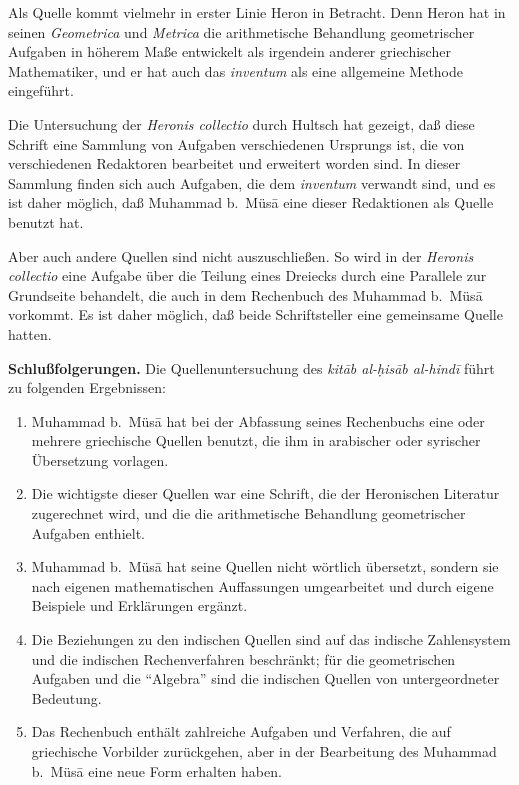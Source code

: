 \documentclass[11pt,a4paper]{article}
\newcommand{\enquote}[1]{``#1''}
\begin{document}
Als Quelle kommt vielmehr in erster Linie Heron in Betracht. Denn Heron hat in seinen \textit{Geometrica} und \textit{Metrica} die arithmetische Behandlung geometrischer Aufgaben in h\"oherem Ma\ss{}e entwickelt als irgendein anderer griechischer Mathematiker, und er hat auch das \textit{inventum} als eine allgemeine Methode eingef\"uhrt.

Die Untersuchung der \textit{Heronis collectio} durch Hultsch hat gezeigt, da\ss{} diese Schrift eine Sammlung von Aufgaben verschiedenen Ursprungs ist, die von verschiedenen Redaktoren bearbeitet und erweitert worden sind. In dieser Sammlung finden sich auch Aufgaben, die dem \textit{inventum} verwandt sind, und es ist daher m\"oglich, da\ss{} Muhammad b.\ M\"us\=a eine dieser Redaktionen als Quelle benutzt hat.

Aber auch andere Quellen sind nicht auszuschlie\ss{}en. So wird in der \textit{Heronis collectio} eine Aufgabe \"uber die Teilung eines Dreiecks durch eine Parallele zur Grundseite behandelt, die auch in dem Rechenbuch des Muhammad b.\ M\"us\=a vorkommt. Es ist daher m\"oglich, da\ss{} beide Schriftsteller eine gemeinsame Quelle hatten.

\textbf{Schlu\ss{}folgerungen.} Die Quellenuntersuchung des \textit{kit\=ab al-\d{h}is\=ab al-hind\=i} f\"uhrt zu folgenden Ergebnissen:

\begin{enumerate}
\item Muhammad b.\ M\"us\=a hat bei der Abfassung seines Rechenbuchs eine oder mehrere griechische Quellen benutzt, die ihm in arabischer oder syrischer \"Ubersetzung vorlagen.
\item Die wichtigste dieser Quellen war eine Schrift, die der Heronischen Literatur zugerechnet wird, und die die arithmetische Behandlung geometrischer Aufgaben enthielt.
\item Muhammad b.\ M\"us\=a hat seine Quellen nicht w\"ortlich \"ubersetzt, sondern sie nach eigenen mathematischen Auffassungen umgearbeitet und durch eigene Beispiele und Erkl\"arungen erg\"anzt.
\item Die Beziehungen zu den indischen Quellen sind auf das indische Zahlensystem und die indischen Rechenverfahren beschr\"ankt; f\"ur die geometrischen Aufgaben und die \enquote{Algebra} sind die indischen Quellen von untergeordneter Bedeutung.
\item Das Rechenbuch enth\"alt zahlreiche Aufgaben und Verfahren, die auf griechische Vorbilder zur\"uckgehen, aber in der Bearbeitung des Muhammad b.\ M\"us\=a eine neue Form erhalten haben.
\end{enumerate}
\end{document}
